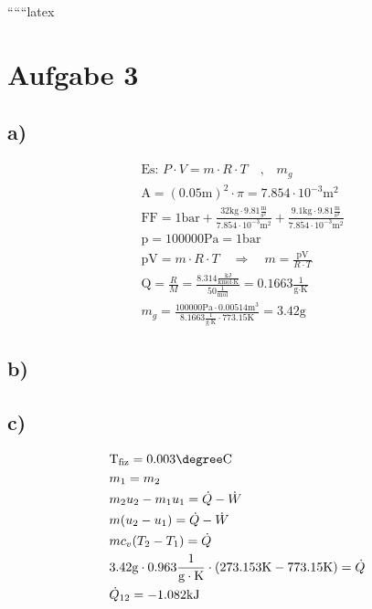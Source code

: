 
``````latex


\section*{Aufgabe 3}

\subsection*{a)}
\begin{align*}
&\text{Es: } P \cdot V = m \cdot R \cdot T \quad \text{,} \quad m_g \\
&\text{A} = (0.05 \text{m})^2 \cdot \pi = 7.854 \cdot 10^{-3} \text{m}^2 \\
&\text{FF} = 1 \text{bar} + \frac{32 \text{kg} \cdot 9.81 \frac{\text{m}}{\text{s}^2}}{7.854 \cdot 10^{-3} \text{m}^2} + \frac{9.1 \text{kg} \cdot 9.81 \frac{\text{m}}{\text{s}^2}}{7.854 \cdot 10^{-3} \text{m}^2} \\
&\text{p} = 100000 \text{Pa} = 1 \text{bar} \\
&\text{pV} = m \cdot R \cdot T \quad \Rightarrow \quad m = \frac{\text{pV}}{R \cdot T} \\
&\text{Q} = \frac{R}{M} = \frac{8.314 \frac{\text{kJ}}{\text{kmol} \cdot \text{K}}}{50 \frac{1}{\text{mol}}} = 0.1663 \frac{1}{\text{g} \cdot \text{K}} \\
&m_g = \frac{100000 \text{Pa} \cdot 0.00514 \text{m}^3}{8.1663 \frac{1}{\text{g} \cdot \text{K}} \cdot 773.15 \text{K}} = 3.42 \text{g}
\end{align*}

\subsection*{b)}

\subsection*{c)}
\begin{align*}
&\text{T}_{\text{fiz}} = 0.003 \degree \text{C} \\
&m_1 = m_2 \\
&m_2 u_2 - m_1 u_1 = \dot{Q} - \dot{W} \\
&m (u_2 - u_1) = \dot{Q} - \dot{W} \\
&m c_v (T_2 - T_1) = \dot{Q} \\
&3.42 \text{g} \cdot 0.963 \frac{1}{\text{g} \cdot \text{K}} \cdot (273.153 \text{K} - 773.15 \text{K}) = \dot{Q} \\
&\dot{Q}_{12} = -1.082 \text{kJ}
\end{align*}

